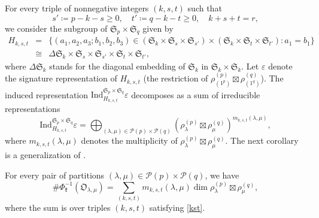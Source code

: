 \documentclass[ALCO,Unicode]{cedram}
\newcommand{\fk}{\mathfrak{k}}
\newcommand{\card}[1]{\# #1}
\newcommand{\Nkorbit}{\mathfrak{O}}
\newcommand{\partitionsof}[1]{\mathcal{P}(#1)}
\newcommand{\permutationsof}[1]{\mathfrak{S}_{#1}}
\begin{document}
For every triple of nonnegative integers $(k,s,t)$ such that
\begin{equation}
\label{kst}
s'\coloneqq p-k-s\geq 0,\quad t'\coloneqq q-k-t\geq 0,\quad k+s+t=r,
\end{equation}
we consider the subgroup of $\permutationsof{p}\times \permutationsof{q}$ given by
\begin{eqnarray*}
H_{k,s,t} & = & \{(a_1,a_2,a_3;b_1,b_2,b_3)\in(\permutationsof{k}\times\permutationsof{s}\times \permutationsof{s'})\times
(\permutationsof{k}\times\permutationsof{t}\times \permutationsof{t'}):a_1=b_1\}\\
 & \cong & \Delta\permutationsof{k}\times \permutationsof{s}\times \permutationsof{s'}\times \permutationsof{t}\times \permutationsof{t'},
\end{eqnarray*}
where $\Delta\permutationsof{k}$ stands for the diagonal embedding
of $\permutationsof{k}$ in
$\permutationsof{k}\times\permutationsof{k}$. Let $\varepsilon$
denote the signature representation of $H_{k,s,t}$ (the restriction
of $\rho_{(1^p)}^{(p)}\boxtimes\rho_{(1^q)}^{(q)}$).
The induced
representation
$\mathrm{Ind}_{H_{k,s,t}}^{\permutationsof{p}\times\permutationsof{q}}\varepsilon$
decomposes as a  sum of irreducible representations
\[
\mathrm{Ind}_{H_{k,s,t}}^{\permutationsof{p}\times\permutationsof{q}}\varepsilon=\bigoplus_{(\lambda,\mu)\in\partitionsof{p}\times\partitionsof{q}} (\rho_\lambda^{(p)}\boxtimes \rho_\mu^{(q)})^{m_{k,s,t}(\lambda,\mu)},
\]
where $m_{k,s,t}(\lambda,\mu)$ denotes the multiplicity of $\rho_\lambda^{(p)}\boxtimes \rho_\mu^{(q)}$.
The next corollary is a generalization of \cite[Corollary 7.10]{FN2}.

\begin{coro}
For every pair of partitions $(\lambda,\mu)\in\partitionsof{p}\times\partitionsof{q}$, we have
\[\card\Phi_\fk^{-1}(\Nkorbit_{\lambda,\mu})=\sum_{(k,s,t)}m_{k,s,t}(\lambda,\mu)\dim \rho_\lambda^{(p)}\boxtimes \rho_\mu^{(q)},\]
where the sum is over triples $(k,s,t)$ satisfying \eqref{kst}.
\end{coro}
\end{document}
